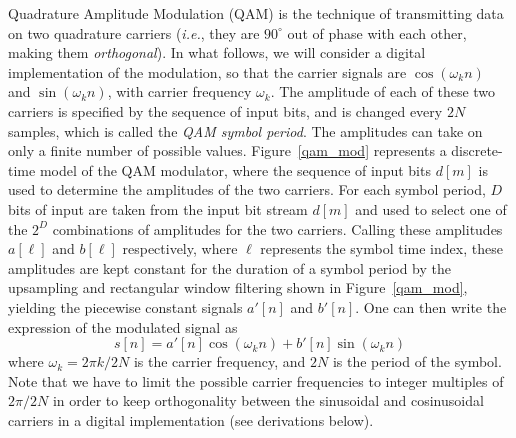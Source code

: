 \documentclass[letterpaper,12pt]{article}
\begin{document}
Quadrature Amplitude Modulation (QAM) is the technique of
transmitting data on two quadrature carriers (\textit{i.e.}, they are
$90^{\circ}$ out of phase with each other, making them {\it
orthogonal}).
In what follows, we will consider a digital implementation of the modulation,
so that the carrier signals are
 $\cos(\omega_kn)$ and
$\sin(\omega_kn)$, with carrier frequency $\omega_k$. The
amplitude of each of these two carriers is specified by the
sequence of input bits, and is changed every $2N$ samples, which
is called the {\em QAM symbol period}. The amplitudes can take on
only a finite number of possible values.
Figure~\ref{qam_mod} represents a discrete-time model of the QAM
modulator, where
the sequence of input bits $d[m]$ is used to determine the amplitudes of the
two carriers. %
For each symbol period, $D$ bits of input are taken from the input
bit stream $d[m]$ and used to select one of the $2^D$ combinations
of amplitudes for the two carriers. Calling these amplitudes
$a[\ell]$ and $b[\ell]$ respectively, where $\ell$ represents the
symbol time index, these amplitudes are kept constant for the
duration of a symbol period by the upsampling and rectangular
window filtering shown in Figure~\ref{qam_mod}, yielding the
piecewise constant signals $a'[n]$ and $b'[n]$.
One can then write the expression of the modulated signal as   %
\begin{equation}\label{basic_qam_defn}
  s[n]=a'[n]\cos(\omega_kn)+b'[n]\sin(\omega_kn)%
\end{equation}
where $\omega_k=2\pi{k}/2N$ is the carrier frequency, and $2N$ is
the period of the symbol. Note that we have to limit the possible carrier frequencies to integer multiples of $2\pi/2N$ in order to keep orthogonality between the sinusoidal and cosinusoidal carriers in a digital implementation (see derivations below).
\end{document}
